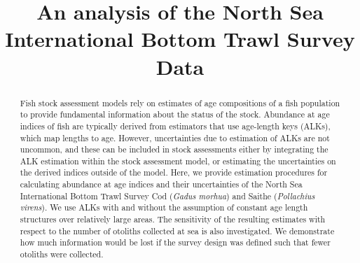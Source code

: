 \documentclass[a4paper 12pt]{article}
\title{\bf 
}
\author{}
\date{}
\numberwithin{equation}{section}
\begin{document}
\title{An analysis of the North Sea International Bottom Trawl Survey Data}

\maketitle


\begin{abstract}
Fish stock assessment models rely on estimates of age compositions of a fish population to provide fundamental information about the status of the stock. Abundance at age indices of fish are typically derived from estimators that use age-length keys (ALKs), which map lengths to age. However, uncertainties due to estimation of ALKs are not uncommon, and these can be included in stock assessments either by integrating the ALK estimation within the stock assessment model, or estimating the uncertainties on the derived indices outside of the model. Here, we provide estimation procedures for calculating abundance at age indices and their uncertainties of the North Sea International Bottom Trawl Survey Cod (\textit{Gadus morhua}) and Saithe (\textit{Pollachius virens}). We use ALKs with and without the assumption of constant age length structures over relatively large areas. The sensitivity of the resulting estimates with respect to the number of otoliths collected at sea is also investigated. We demonstrate how much information would be lost if the survey design was defined such that fewer otoliths were collected.



\end{abstract}
\end{document}
